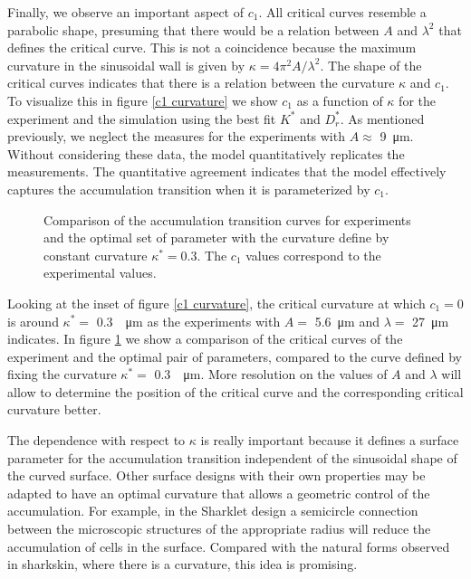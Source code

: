 Finally, we observe an important aspect of $c_1$. All critical curves resemble a parabolic shape, presuming that there would be a relation between $A$ and $\lambda^2$ that defines the critical curve. This is not a coincidence because the maximum curvature in the sinusoidal wall is given by $\kappa=4\pi^2A/\lambda^2$. The shape of the critical curves indicates that there is a relation between the curvature $\kappa$ and $c_1$. To visualize this in figure \ref{c1 curvature} we show $c_1$ as a function of $\kappa$ for the experiment and the simulation using the best fit $K^*$ and $D_r^*$. As mentioned previously, we neglect the measures for the experiments with $A\approx$ \SI{9}{\micro\meter}. Without considering these data, the model quantitatively replicates the measurements. The quantitative agreement indicates that the model effectively captures the accumulation transition when it is parameterized by $c_1$.  

\newpage

\begin{figure}
\centering

\caption[Comparison of the accumulation transition curves for experiments and the optimal set of parameter with the curvature define by constant curvature $\kappa^*=0.3$]{Comparison of the accumulation transition curves for experiments and the optimal set of parameter with the curvature define by constant curvature $\kappa^*=0.3$. The $c_1$ values correspond to the experimental values.  }
\label{c1 curvature fit}
\end{figure}

Looking at the inset of figure \ref{c1 curvature}, the critical curvature at which $c_1=0$ is around $\kappa^* =$ \SI{0.3}{\per \micro \meter} as the experiments with $A=$ \SI{5.6}{\micro\meter} and $\lambda=$ \SI{27}{\micro\meter} indicates. In figure \ref{c1 curvature fit} we show a comparison of the critical curves of the experiment and the optimal pair of parameters, compared to the curve defined by fixing the curvature $\kappa^* =$ \SI{0.3}{\per \micro \meter}. More resolution on the values of $A$ and $\lambda$ will allow to determine the position of the critical curve and the corresponding critical curvature better. 


The dependence with respect to $\kappa$ is really important because it defines a surface parameter for the accumulation transition independent of the sinusoidal shape of the curved surface. Other surface designs with their own properties may be adapted to have an optimal curvature that allows a geometric control of the accumulation. For example, in the Sharklet design \cite{Reddy2011MicropatternedColi} a semicircle connection between the microscopic structures of the appropriate radius will reduce the accumulation of cells in the surface. Compared with the natural forms observed in sharkskin, where there is a curvature, this idea is promising.


